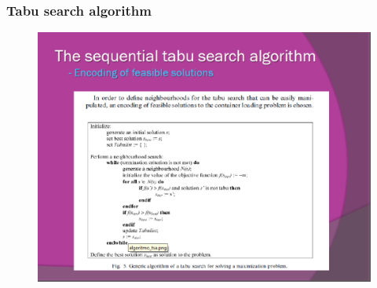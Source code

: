 \documentclass{beamer}
\begin{document}
\begin{frame}
\frametitle{Tabu search algorithm }
\begin{figure}[!th]
\begin{center}
\includegraphics[width=1\textwidth]{img/picn11.eps}
\end{center}
\end{figure}
\end{frame}
\end{document}
